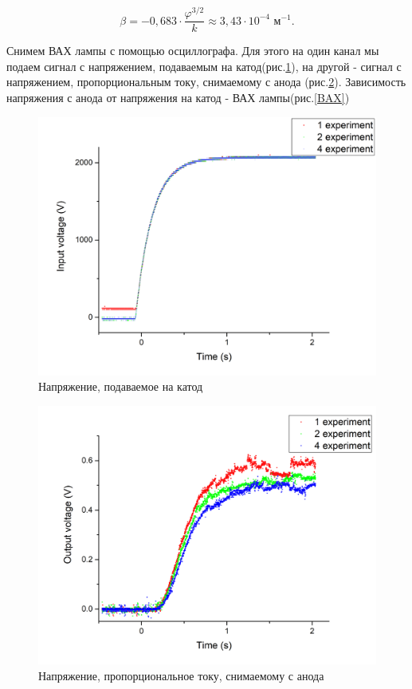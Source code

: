 \documentclass[a4paper,12pt]{article}
\theoremstyle{plain} %
\theoremstyle{definition} %
\theoremstyle{remark} %
\begin{document}
\begin{equation}
    \beta = -0,683\cdot\frac{\varphi^{3/2}}{k}\approx 3,43\cdot 10^{-4} \text{ м}^{-1}.
\end{equation}

Снимем ВАХ лампы с помощью осциллографа. Для этого на один канал мы подаем сигнал с напряжением, подаваемым на катод(рис.\ref{voltage}), на другой - сигнал с напряжением, пропорциональным току, снимаемому с анода (рис.\ref{current}). Зависимость напряжения с анода от напряжения на катод - ВАХ лампы(рис.\ref{BAX})
\begin{figure}[H]
	\centering
	\includegraphics[scale=0.55]{Graph1.jpg}
	\caption{Напряжение, подаваемое на катод}
	\label{voltage}
\end{figure}
\begin{figure}[H]
	\centering
	\includegraphics[scale=0.55]{Graph2.jpg}
	\caption{Напряжение, пропорциональное току, снимаемому с анода}
	\label{current}
\end{figure}
\end{document}
